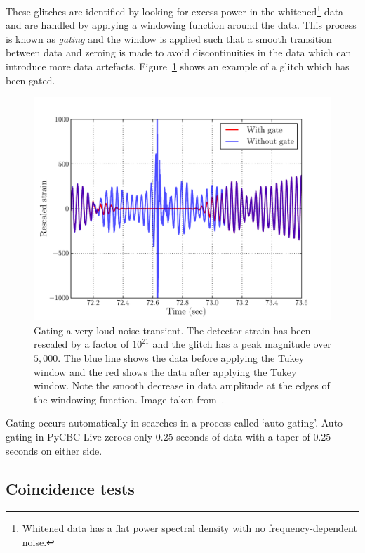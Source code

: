These glitches are identified by looking for excess power in the whitened\footnote{Whitened data has a flat power spectral density with no frequency-dependent noise.} data and are handled by applying a windowing function around the data. This process is known as \textit{gating} and the window is applied such that a smooth transition between data and zeroing is made to avoid discontinuities in the data which can introduce more data artefacts. Figure~\ref{2:fig:autogating} shows an example of a glitch which has been gated.
%
\begin{figure}
    \centering
    \includegraphics[width=1.0\linewidth]{images/2_searches/autogating.pdf}
    \caption{Gating a very loud noise transient. The detector strain has been rescaled by a factor of $10^{21}$ and the glitch has a peak magnitude over $5,000$. The blue line shows the data before applying the Tukey window and the red shows the data after applying the Tukey window. Note the smooth decrease in data amplitude at the edges of the windowing function. Image taken from~\cite{PyCBC:2016}.}
    \label{2:fig:autogating}
\end{figure}
%

Gating occurs automatically in \gwadj searches in a process called `auto-gating'. Auto-gating in PyCBC Live zeroes only $0.25$ seconds of data with a taper of $0.25$ seconds on either side.

\subsection{\label{2:sec:coincidence-test}Coincidence tests}

